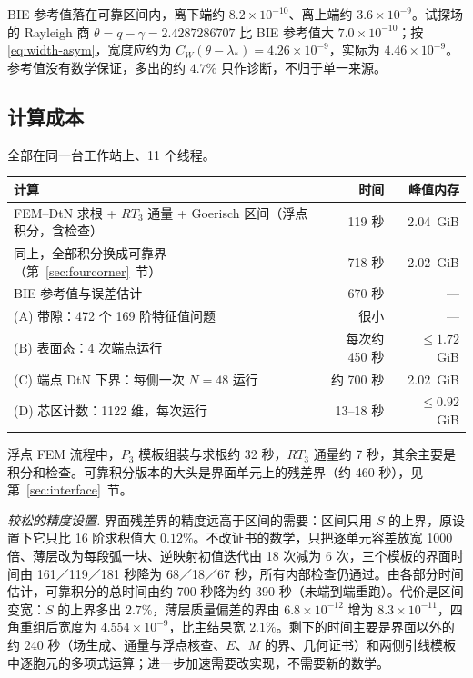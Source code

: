 \documentclass[11pt,a4paper,fontset=fandol]{ctexart}
\begin{document}
BIE 参考值落在可靠区间内，离下端约 $8.2\times10^{-10}$、离上端约 $3.6\times10^{-9}$。试探场的 Rayleigh 商 $\theta=q-\gamma=2.4287286707$ 比 BIE 参考值大 $7.0\times10^{-10}$；按 \eqref{eq:width-asym}，宽度应约为 $C_W(\theta-\lambda_*)=4.26\times10^{-9}$，实际为 $4.46\times10^{-9}$。参考值没有数学保证，多出的约 $4.7\%$ 只作诊断，不归于单一来源。

\subsection{计算成本}

全部在同一台工作站上、11 个线程。

\begin{center}
\small
\begin{tabular}{>{\raggedright\arraybackslash}p{6.4cm}rr}
\toprule
计算 & 时间 & 峰值内存 \\
\midrule
FEM--DtN 求根 + $RT_3$ 通量 + Goerisch 区间（浮点积分，含检查） & 119 秒 & 2.04~GiB \\
同上，全部积分换成可靠界（第~\ref{sec:fourcorner}~节） & 718 秒 & 2.02~GiB \\
BIE 参考值与误差估计 & 670 秒 & — \\
\midrule
(A) 带隙：472 个 169 阶特征值问题 & 很小 & — \\
(B) 表面态：4 次端点运行 & 每次约 450 秒 & $\le1.72$~GiB \\
(C) 端点 DtN 下界：每侧一次 $N=48$ 运行 & 约 700 秒 & 2.02~GiB \\
(D) 芯区计数：1122 维，每次运行 & 13--18 秒 & $\le0.92$~GiB \\
\bottomrule
\end{tabular}
\end{center}

浮点 FEM 流程中，$P_3$ 模板组装与求根约 32 秒，$RT_3$ 通量约 7 秒，其余主要是积分和检查。可靠积分版本的大头是界面单元上的残差界（约 460 秒），见第~\ref{sec:interface}~节。

\emph{较松的精度设置.} 界面残差界的精度远高于区间的需要：区间只用 $S$ 的上界，原设置下它只比 16 阶求积值大 $0.12\%$。不改证书的数学，只把逐单元容差放宽 1000 倍、薄层改为每段弧一块、逆映射初值迭代由 18 次减为 6 次，三个模板的界面时间由 161／119／181 秒降为 68／18／67 秒，所有内部检查仍通过。由各部分时间估计，可靠积分的总时间由约 700 秒降为约 390 秒（未端到端重跑）。代价是区间变宽：$S$ 的上界多出 $2.7\%$，薄层质量偏差的界由 $6.8\times10^{-12}$ 增为 $8.3\times10^{-11}$，四角重组后宽度为 $4.554\times10^{-9}$，比主结果宽 $2.1\%$。剩下的时间主要是界面以外的约 240 秒（场生成、通量与浮点核查、$E$、$M$ 的界、几何证书）和两侧引线模板中逐胞元的多项式运算；进一步加速需要改实现，不需要新的数学。
\end{document}
